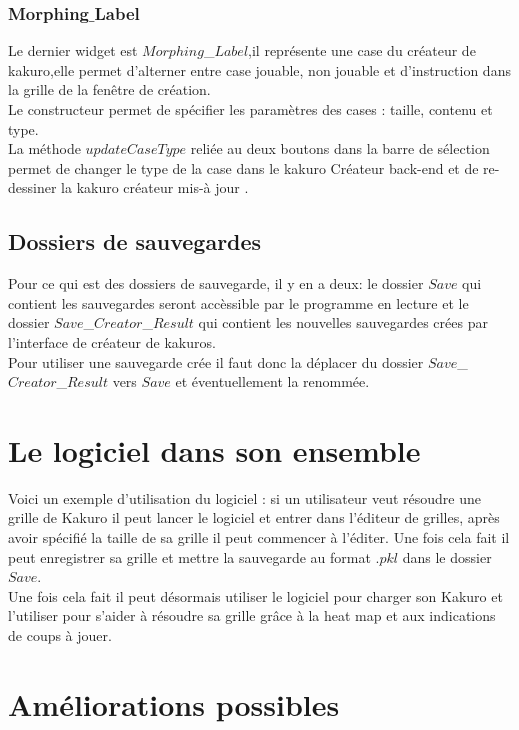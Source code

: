 \documentclass[french,12pt]{article}
\begin{document}
\subsubsection{Morphing$\_$Label}

Le dernier widget est $Morphing$\_$Label$,il représente une case du créateur de kakuro,elle permet d'alterner entre case jouable, non jouable et d'instruction dans la grille de la fenêtre de création. \\
Le constructeur permet de spécifier les paramètres des cases : taille, contenu et type.  \\
La méthode $updateCaseType$ reliée au deux boutons dans la barre de sélection  permet de changer le type de la case dans le kakuro Créateur back-end et de re-dessiner la kakuro créateur mis-à jour .

\subsection{Dossiers de sauvegardes}

Pour ce qui est des dossiers de sauvegarde, il y en a deux:  le dossier $Save$ qui contient les sauvegardes seront accèssible par le programme en lecture et le dossier $Save$\_$Creator$\_$Result$ qui contient les nouvelles sauvegardes crées par l'interface de créateur de kakuros. \\
Pour utiliser une sauvegarde crée il faut donc la déplacer du dossier $Save$\_$Creator$\_$Result$ vers $Save$ et éventuellement la renommée.

\section{Le logiciel dans son ensemble}

Voici un exemple d'utilisation du logiciel : si un utilisateur veut résoudre une grille de Kakuro il peut lancer le logiciel et entrer dans l'éditeur de grilles, après avoir spécifié la taille de sa grille il peut commencer à l'éditer. Une fois cela fait il peut enregistrer sa grille et mettre la sauvegarde au format $.pkl$ dans le dossier $Save$. \\ Une fois cela fait il peut désormais utiliser le logiciel pour charger son Kakuro et l'utiliser pour s'aider à résoudre sa grille grâce à la heat map et aux indications de coups à jouer. 

\section{Améliorations possibles}
\end{document}
